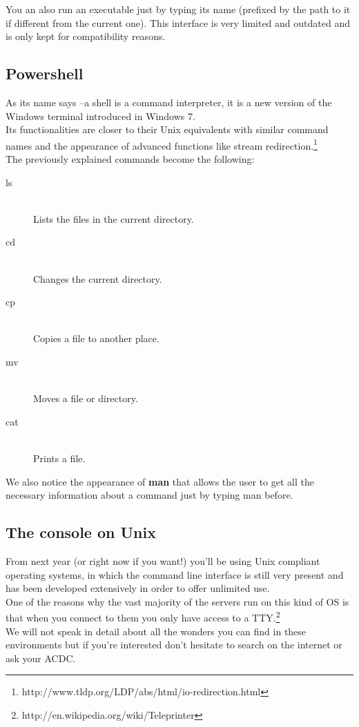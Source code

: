 You an also run an executable just by typing its name (prefixed by the path to it if
different from the current one). This interface is very limited and outdated and is only kept for compatibility reasons.

\subsection{Powershell}
As its name says --a shell is a command interpreter, it is
a new version of the Windows terminal introduced in Windows 7.\\
Its functionalities are closer to their Unix equivalents with similar command names
and the appearance of advanced functions like stream redirection.\footnote{http://www.tldp.org/LDP/abs/html/io-redirection.html}\\
The previously explained commands become the following:
\newpage
\begin{description}
    \item[ls] \hfill \\
        Lists the files in the current directory.
    \item[cd] \hfill \\
        Changes the current directory.
    \item[cp] \hfill \\
        Copies a file to another place.
    \item[mv] \hfill \\
        Moves a file or directory.
    \item[cat] \hfill \\
        Prints a file.
\end{description}

We also notice the appearance of \textbf{man} that allows the user to get all the necessary
information about a command just by typing man before.

\subsection{The console on Unix}
From next year (or right now if you want!) you'll be using
Unix compliant operating systems, in which the command line interface
is still very present and has been developed extensively in order to offer unlimited use.\\
One of the reasons why the vast majority of the servers run on this kind of OS is that when you connect to them you only have access to a TTY.\footnote{http://en.wikipedia.org/wiki/Teleprinter}\\
We will not speak in detail about all the wonders you can find in these environments
but if you're interested don't hesitate to search on the internet or ask your ACDC.

